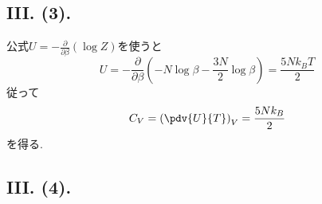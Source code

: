 \subsection*{III. (3). }

公式$U=-\frac{\partial}{\partial \beta}(\log{Z})$を使うと
\begin{equation}
  U=-\frac{\partial}{\partial\beta}(-N\log\beta-\frac{3N}{2}\log\beta)=\frac{5Nk_B T}{2}
\end{equation}
従って
\begin{equation}
  C_V=\left( \pdv{U}{T} \right)_V=\frac{5Nk_B}{2}
\end{equation}
を得る. 

\subsection*{III. (4). }








